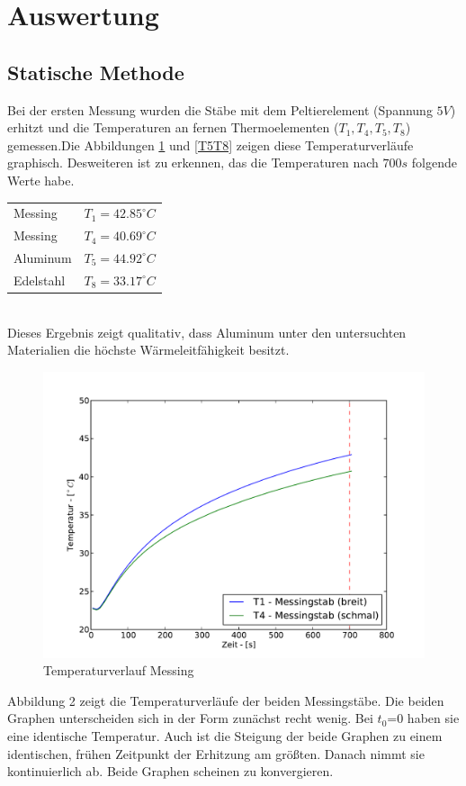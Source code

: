 \documentclass[11pt]{article}
\begin{document}
\section{Auswertung}
\subsection{Statische Methode}

Bei der ersten Messung wurden die Stäbe mit dem Peltierelement (Spannung $5V$) erhitzt und die Temperaturen an fernen Thermoelementen ($T_1, T_4, T_5, T_8$) gemessen.Die Abbildungen \ref{T1T4} und \ref{T5T8} zeigen diese Temperaturverläufe graphisch. Desweiteren ist zu erkennen, das die Temperaturen nach $700s$ folgende Werte habe.

\begin{tabular}{@{$\bullet$  }ll}
Messing &$T_1= 42.85 ^\circ C$\\
Messing &$T_4 =  40.69 ^\circ C$\\
Aluminum &$T_5 = 44.92 ^\circ C$\\
Edelstahl &$T_8 =33.17 ^\circ C$\\

\end{tabular}\\
Dieses Ergebnis zeigt qualitativ, dass Aluminum unter den untersuchten Materialien die höchste Wärmeleitfähigkeit besitzt.
\begin{figure}[H]
\centering
\includegraphics[width = \textwidth]{Diagramme/Abb1.pdf}
\caption{Temperaturverlauf Messing}
\label{T1T4}
\end{figure}\noindent
Abbildung 2 zeigt die Temperaturverläufe der beiden Messingstäbe. Die beiden Graphen unterscheiden sich in der Form zunächst recht wenig. Bei $t_0$=0 haben sie eine identische Temperatur. Auch ist die Steigung der beide Graphen zu einem identischen, frühen Zeitpunkt der Erhitzung am größten. Danach nimmt sie kontinuierlich ab. Beide Graphen scheinen zu konvergieren.\newline
\end{document}
